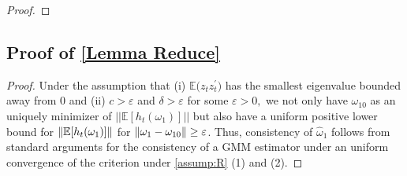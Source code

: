 \documentclass[11pt, letterpaper, twoside]{article}
\begin{document}
\begin{appendices}
\begin{proof}
\end{proof}

\subsection{\texorpdfstring{Proof of \cref{Lemma Reduce}}{Proof of Lemma 2}}

\begin{proof}

    Under the assumption that (i) $ \mathbb{E(}z_{t}z_{t}^{\prime })$ has the smallest eigenvalue bounded away from 0 and (ii) $c>\varepsilon $ and $\delta >\varepsilon $ for some $ \varepsilon >0,$ we not only have $\omega _{10}$ as an uniquely minimizer of $||\mathbb{E}[h_{t}(\omega _{1})]||$ but also have a uniform positive lower bound for $\lVert\operatorname{\mathbb{E}}[h_{t}(\omega _{1})]\rVert$ for $\lVert\omega _{1}-\omega _{10}\rVert \geq \varepsilon$. Thus, consistency of $\widehat{\omega }_{1}$ follows from standard arguments for the consistency of a GMM estimator under an uniform convergence of the criterion under \cref{assump:R} (1) and (2).


\end{proof}
\end{appendices}
\end{document}
